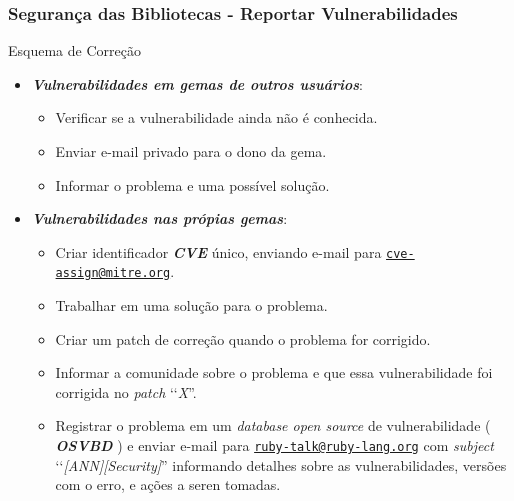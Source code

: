  
\begin{frame}
 \frametitle{Segurança das Bibliotecas - Reportar Vulnerabilidades}
 
  \begin{block}{Esquema de Correção}
   
   \begin{itemize}    

   \item \emph{\textbf{Vulnerabilidades em gemas de outros usuários}}:
   
    \begin{itemize}
   
     \item Verificar se a vulnerabilidade ainda não é conhecida.
   
     \item Enviar e-mail privado para o dono da gema.
    
     \item Informar o problema e uma possível solução.
    
    \end{itemize}
   
   \item \emph{\textbf{Vulnerabilidades nas própias gemas}}:
   
    \begin{itemize}
   
     \item Criar identificador \emph{\textbf{CVE}} único, enviando e-mail para 
     \href{cve-assign@mitre.org}{\nolinkurl{cve-assign@mitre.org}}.
   
     \item Trabalhar em uma solução para o problema.
     
     \item Criar um patch de correção quando o problema for corrigido.
    
     \item Informar a comunidade sobre o problema e que essa vulnerabilidade foi corrigida no \emph{patch} ‘‘\emph{X}''.
     
     \item Registrar o problema em um \emph{database open source} de vulnerabilidade ( \emph{\textbf{OSVBD}} ) e 
     enviar e-mail para 
     \href{ruby-talk@ruby-lang.org}{\nolinkurl{ruby-talk@ruby-lang.org}} com \emph{subject} ‘‘\emph{[ANN][Security]}''
     informando detalhes sobre as vulnerabilidades, versões com o erro, e ações a seren tomadas.
    
    \end{itemize}
   
   \end{itemize}
   
  \end{block}
 
\end{frame}